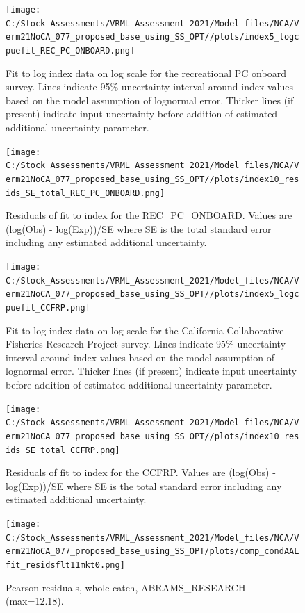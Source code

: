 \documentclass[
  english,
  a4paper,
]{article}
\begin{document}
\begin{figure}
\centering
\texttt{[image: C:/Stock\_Assessments/VRML\_Assessment\_2021/Model\_files/NCA/Verm21NoCA\_077\_proposed\_base\_using\_SS\_OPT//plots/index5\_logcpuefit\_REC\_PC\_ONBOARD.png]}
\caption{Fit to log index data on log scale for the recreational PC onboard survey. Lines indicate 95\% uncertainty interval around index values based on the model assumption of lognormal error. Thicker lines (if present) indicate input uncertainty before addition of estimated additional uncertainty parameter.\label{fig:log-cpue-REC-PC-ONBOARD}}
\end{figure}

\begin{figure}
\centering
\texttt{[image: C:/Stock\_Assessments/VRML\_Assessment\_2021/Model\_files/NCA/Verm21NoCA\_077\_proposed\_base\_using\_SS\_OPT//plots/index10\_resids\_SE\_total\_REC\_PC\_ONBOARD.png]}
\caption{Residuals of fit to index for the REC\_PC\_ONBOARD. Values are (log(Obs) - log(Exp))/SE where SE is the total standard error including any estimated additional uncertainty.\label{fig:cpue-resid-REC-PC-ONBOARD}}
\end{figure}

\begin{figure}
\centering
\texttt{[image: C:/Stock\_Assessments/VRML\_Assessment\_2021/Model\_files/NCA/Verm21NoCA\_077\_proposed\_base\_using\_SS\_OPT//plots/index5\_logcpuefit\_CCFRP.png]}
\caption{Fit to log index data on log scale for the California Collaborative Fisheries Research Project survey. Lines indicate 95\% uncertainty interval around index values based on the model assumption of lognormal error. Thicker lines (if present) indicate input uncertainty before addition of estimated additional uncertainty parameter.\label{fig:log-cpue-CCFRP}}
\end{figure}

\begin{figure}
\centering
\texttt{[image: C:/Stock\_Assessments/VRML\_Assessment\_2021/Model\_files/NCA/Verm21NoCA\_077\_proposed\_base\_using\_SS\_OPT//plots/index10\_resids\_SE\_total\_CCFRP.png]}
\caption{Residuals of fit to index for the CCFRP. Values are (log(Obs) - log(Exp))/SE where SE is the total standard error including any estimated additional uncertainty.\label{fig:cpue-resid-CCFRP}}
\end{figure}

\FloatBarrier

\begin{figure}
\centering
\texttt{[image: C:/Stock\_Assessments/VRML\_Assessment\_2021/Model\_files/NCA/Verm21NoCA\_077\_proposed\_base\_using\_SS\_OPT/plots/comp\_condAALfit\_residsflt11mkt0.png]}
\caption{Pearson residuals, whole catch, ABRAMS\_RESEARCH (max=12.18).\label{fig:comp_condAALfit_residsflt11mkt0}}
\end{figure}
\end{document}
